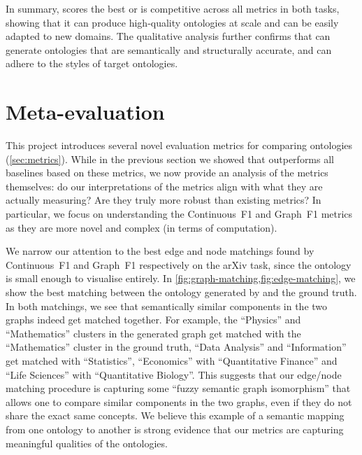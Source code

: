 In summary, \name scores the best or is competitive across all metrics in both tasks, showing that it can produce high-quality ontologies at scale and can be easily adapted to new domains. The qualitative analysis further confirms that \name can generate ontologies that are semantically and structurally accurate, and can adhere to the styles of target ontologies.

\section{Meta-evaluation}

This project introduces several novel evaluation metrics for comparing ontologies (\cref{sec:metrics}). While in the previous section we showed that \name outperforms all baselines based on these metrics, we now provide an analysis of the metrics themselves: do our interpretations of the metrics align with what they are actually measuring? Are they truly more robust than existing metrics? In particular, we focus on understanding the Continuous~F1 and Graph~F1 metrics as they are more novel and complex (in terms of computation).

We narrow our attention to the best edge and node matchings found by Continuous~F1 and Graph~F1 respectively on the arXiv task, since the ontology is small enough to visualise entirely. In \cref{fig:graph-matching,fig:edge-matching}, we show the best matching between the ontology generated by \name and the ground truth. In both matchings, we see that semantically similar components in the two graphs indeed get matched together. For example, the ``Physics'' and ``Mathematics'' clusters in the generated graph get matched with the ``Mathematics'' cluster in the ground truth, ``Data Analysis'' and ``Information'' get matched with ``Statistics'', ``Economics'' with ``Quantitative Finance'' and ``Life Sciences'' with ``Quantitative Biology''. This suggests that our edge/node matching procedure is capturing some ``fuzzy semantic graph isomorphism'' that allows one to compare similar components in the two graphs, even if they do not share the exact same concepts. We believe this example of a semantic mapping from one ontology to another is strong evidence that our metrics are capturing meaningful qualities of the ontologies.

